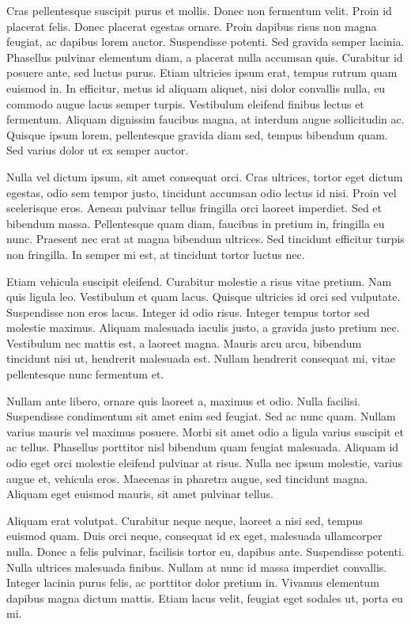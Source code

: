Cras pellentesque suscipit purus et mollis. Donec non fermentum velit. Proin id
placerat felis. Donec placerat egestas ornare. Proin dapibus risus non magna
feugiat, ac dapibus lorem auctor. Suspendisse potenti. Sed gravida semper
lacinia. Phasellus pulvinar elementum diam, a placerat nulla accumsan quis.
Curabitur id posuere ante, sed luctus purus. Etiam ultricies ipsum erat, tempus
rutrum quam euismod in. In efficitur, metus id aliquam aliquet, nisi dolor
convallis nulla, eu commodo augue lacus semper turpis. Vestibulum eleifend
finibus lectus et fermentum. Aliquam dignissim faucibus magna, at interdum
augue sollicitudin ac. Quisque ipsum lorem, pellentesque gravida diam sed,
tempus bibendum quam. Sed varius dolor ut ex semper auctor.

Nulla vel dictum ipsum, sit amet consequat orci. Cras ultrices, tortor eget
dictum egestas, odio sem tempor justo, tincidunt accumsan odio lectus id nisi.
Proin vel scelerisque eros. Aenean pulvinar tellus fringilla orci laoreet
imperdiet. Sed et bibendum massa. Pellentesque quam diam, faucibus in pretium
in, fringilla eu nunc. Praesent nec erat at magna bibendum ultrices. Sed
tincidunt efficitur turpis non fringilla. In semper mi est, at tincidunt tortor
luctus nec.

Etiam vehicula suscipit eleifend. Curabitur molestie a risus vitae pretium. Nam
quis ligula leo. Vestibulum et quam lacus. Quisque ultricies id orci sed
vulputate. Suspendisse non eros lacus. Integer id odio risus. Integer tempus
tortor sed molestie maximus. Aliquam malesuada iaculis justo, a gravida justo
pretium nec. Vestibulum nec mattis est, a laoreet magna. Mauris arcu arcu,
bibendum tincidunt nisi ut, hendrerit malesuada est. Nullam hendrerit consequat
mi, vitae pellentesque nunc fermentum et.

Nullam ante libero, ornare quis laoreet a, maximus et odio. Nulla facilisi.
Suspendisse condimentum sit amet enim sed feugiat. Sed ac nunc quam. Nullam
varius mauris vel maximus posuere. Morbi sit amet odio a ligula varius suscipit
et ac tellus. Phasellus porttitor nisl bibendum quam feugiat malesuada. Aliquam
id odio eget orci molestie eleifend pulvinar at risus. Nulla nec ipsum
molestie, varius augue et, vehicula eros. Maecenas in pharetra augue, sed
tincidunt magna. Aliquam eget euismod mauris, sit amet pulvinar tellus.

Aliquam erat volutpat. Curabitur neque neque, laoreet a nisi sed, tempus
euismod quam. Duis orci neque, consequat id ex eget, malesuada ullamcorper
nulla. Donec a felis pulvinar, facilisis tortor eu, dapibus ante. Suspendisse
potenti. Nulla ultrices malesuada finibus. Nullam at nunc id massa imperdiet
convallis. Integer lacinia purus felis, ac porttitor dolor pretium in. Vivamus
elementum dapibus magna dictum mattis. Etiam lacus velit, feugiat eget sodales
ut, porta eu mi.

